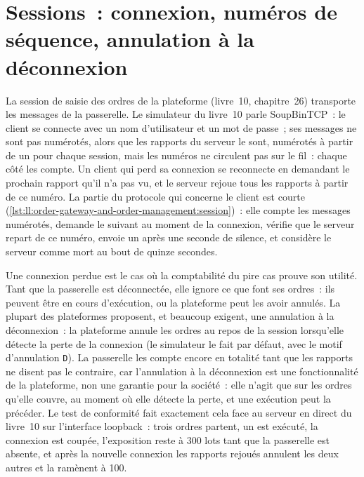 \section{Sessions~: connexion, numéros de séquence, annulation à la déconnexion}

La session de saisie des ordres de la plateforme (livre~10, chapitre~26) transporte les messages de la passerelle. Le simulateur du livre~10 parle SoupBinTCP~:
le client se connecte avec un nom d'utilisateur et un mot de passe~; ses messages ne sont pas numérotés, alors que les rapports du serveur le sont, numérotés
à partir de un pour chaque session, mais les numéros ne circulent pas sur le fil~: chaque côté les compte. Un client qui perd sa connexion se reconnecte
en demandant le prochain rapport qu'il n'a pas vu, et le serveur rejoue tous les rapports à partir de ce numéro. La partie du protocole qui concerne le client
est courte (\cref{lst:ll:order-gateway-and-order-management:session})~: elle compte les messages numérotés, demande le suivant
au moment de la connexion, vérifie que le serveur repart de ce numéro, envoie un  après une seconde de silence, et considère le serveur comme mort
au bout de quinze secondes.

\label{lst:ll:order-gateway-and-order-management:session}

Une connexion perdue est le cas où la comptabilité du pire cas prouve son utilité. Tant que la passerelle est déconnectée, elle ignore ce que font ses
ordres~: ils peuvent être en cours d'exécution, ou la plateforme peut les avoir annulés. La plupart des plateformes proposent, et beaucoup exigent, une annulation à la
déconnexion~: la plateforme annule les ordres au repos de la session lorsqu'elle détecte la perte de la connexion (le simulateur le fait
par défaut, avec le motif d'annulation \texttt{D}). La passerelle les compte encore en totalité tant que les rapports ne disent pas le contraire, car
l'annulation à la déconnexion est une fonctionnalité de la plateforme, non une garantie pour la société~: elle n'agit que sur les ordres qu'elle couvre, au moment où elle
détecte la perte, et une exécution peut la précéder. Le test de conformité fait exactement cela face au serveur en direct du livre~10 sur l'interface
loopback~: trois ordres partent, un est exécuté, la connexion est coupée, l'exposition reste à 300 lots tant que la passerelle est
absente, et après la nouvelle connexion les rapports rejoués annulent les deux autres et la ramènent à 100.

